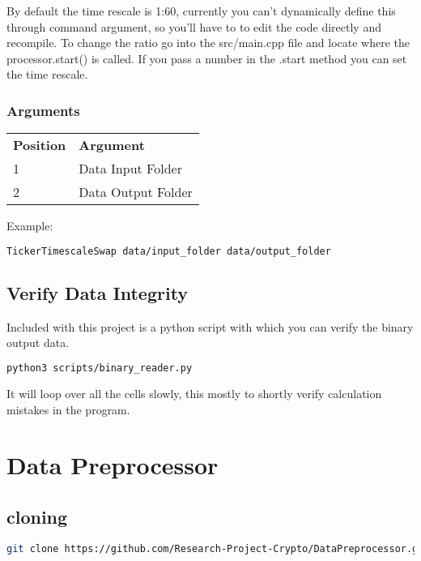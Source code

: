 \documentclass[12pt,a4paper]{article}
\begin{document}
By default the time rescale is 1:60, currently you can't dynamically define this through command argument, so you'll have to to edit the code directly and recompile. To change the ratio go into the src/main.cpp file and locate where the processor.start() is called. If you pass a number in the .start method you can set the time rescale.

\subsubsection{Arguments}

\begin{table}[H]
\begin{tabular}{ll}
\textbf{Position} & \textbf{Argument}  \\
1                 & Data Input Folder  \\
2                 & Data Output Folder
\end{tabular}
\end{table}

Example:
\begin{lstlisting}[language=bash]
TickerTimescaleSwap data/input_folder data/output_folder
\end{lstlisting}

\subsection{Verify Data Integrity}

Included with this project is a python script with which you can verify the binary output data.

\begin{lstlisting}[language=bash]
python3 scripts/binary_reader.py
\end{lstlisting}

It will loop over all the cells slowly, this mostly to shortly verify calculation mistakes in the program.

\section{Data Preprocessor}

\subsection{cloning}

\begin{lstlisting}[language=bash]
git clone https://github.com/Research-Project-Crypto/DataPreprocessor.git --recursive
\end{lstlisting}
\end{document}
